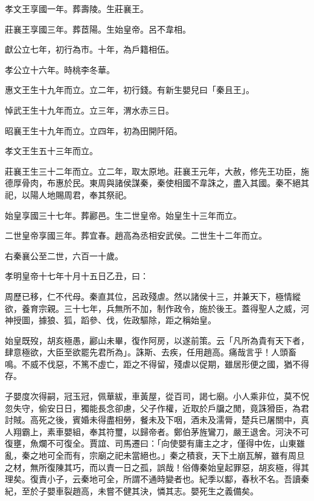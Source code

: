 \begin{pinyinscope}
孝文王享國一年。葬壽陵。生莊襄王。

莊襄王享國三年。葬茝陽。生始皇帝。呂不韋相。

獻公立七年，初行為市。十年，為戶籍相伍。

孝公立十六年。時桃李冬華。

惠文王生十九年而立。立二年，初行錢。有新生嬰兒曰「秦且王」。

悼武王生十九年而立。立三年，渭水赤三日。

昭襄王生十九年而立。立四年，初為田開阡陌。

孝文王生五十三年而立。

莊襄王生三十二年而立。立二年，取太原地。莊襄王元年，大赦，修先王功臣，施德厚骨肉，布惠於民。東周與諸侯謀秦，秦使相國不韋誅之，盡入其國。秦不絕其祀，以陽人地賜周君，奉其祭祀。

始皇享國三十七年。葬酈邑。生二世皇帝。始皇生十三年而立。

二世皇帝享國三年。葬宜春。趙高為丞相安武侯。二世生十二年而立。

右秦襄公至二世，六百一十歲。

孝明皇帝十七年十月十五日乙丑，曰：

周歷已移，仁不代母。秦直其位，呂政殘虐。然以諸侯十三，并兼天下，極情縱欲，養育宗親。三十七年，兵無所不加，制作政令，施於後王。蓋得聖人之威，河神授圖，據狼、狐，蹈參、伐，佐政驅除，距之稱始皇。

始皇既歿，胡亥極愚，酈山未畢，復作阿房，以遂前策。云「凡所為貴有天下者，肆意極欲，大臣至欲罷先君所為」。誅斯、去疾，任用趙高。痛哉言乎！人頭畜鳴。不威不伐惡，不篤不虛亡，距之不得留，殘虐以促期，雖居形便之國，猶不得存。

子嬰度次得嗣，冠玉冠，佩華紱，車黃屋，從百司，謁七廟。小人乘非位，莫不怳忽失守，偷安日日，獨能長念卻慮，父子作權，近取於戶牖之閒，竟誅猾臣，為君討賊。高死之後，賓婚未得盡相勞，餐未及下咽，酒未及濡脣，楚兵已屠關中，真人翔霸上，素車嬰組，奉其符璽，以歸帝者。鄭伯茅旌鸞刀，嚴王退舍。河決不可復壅，魚爛不可復全。賈誼、司馬遷曰：「向使嬰有庸主之才，僅得中佐，山東雖亂，秦之地可全而有，宗廟之祀未當絕也。」秦之積衰，天下土崩瓦解，雖有周旦之材，無所復陳其巧，而以責一日之孤，誤哉！俗傳秦始皇起罪惡，胡亥極，得其理矣。復責小子，云秦地可全，所謂不通時變者也。紀季以酅，春秋不名。吾讀秦紀，至於子嬰車裂趙高，未嘗不健其決，憐其志。嬰死生之義備矣。


\end{pinyinscope}